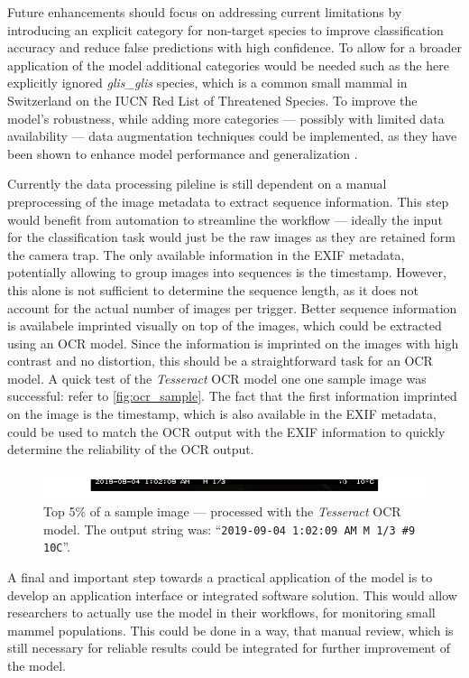 Future enhancements should focus on addressing current limitations by introducing an explicit category for non-target species to improve classification accuracy and reduce false predictions with high confidence.
To allow for a broader application of the model additional categories would be needed such as the here explicitly ignored \textit{glis\_glis} species, which is a common small mammal in Switzerland on the IUCN Red List of Threatened Species.
To improve the model's robustness, while adding more categories --- possibly with limited data availability --- data augmentation techniques could be implemented, as they have been shown to enhance model performance and generalization \autocite{shortenSurveyImageData2019}.

Currently the data processing pileline is still dependent on a manual preprocessing of the image metadata to extract sequence information.
This step would benefit from automation to streamline the workflow --- ideally the input for the classification task would just be the raw images as they are retained form the camera trap.
The only available information in the \ac{EXIF} metadata, potentially allowing to group images into sequences is the timestamp.
However, this alone is not sufficient to determine the sequence length, as it does not account for the actual number of images per trigger.
Better sequence information is availabele imprinted visually on top of the images, which could be extracted using an \ac{OCR} model.
Since the information is imprinted on the images with high contrast and no distortion, this should be a straightforward task for an \ac{OCR} model.
A quick test of the \textit{Tesseract} \ac{OCR} model one one sample image was successful: refer to \autoref{fig:ocr_sample}.
The fact that the first information imprinted on the image is the timestamp, which is also available in the \ac{EXIF} metadata, could be used to match the \ac{OCR} output with the \ac{EXIF} information to quickly determine the reliability of the \ac{OCR} output.

\begin{figure}[ht]
\centering
\includegraphics{figures/ocr_example.pdf}
\caption{Top 5\% of a sample image — processed with the \textit{Tesseract} \ac{OCR} model. The output string was: \enquote{\texttt{2019-09-04 1:02:09 AM M 1/3 \#9 10\textdegree C}}.}
\label{fig:ocr_sample}
\end{figure}

A final and important step towards a practical application of the model is to develop an application interface or integrated software solution.
This would allow researchers to actually use the model in their workflows, for monitoring small mammel populations.
This could be done in a way, that manual review, which is still necessary for reliable results could be integrated for further improvement of the model.
